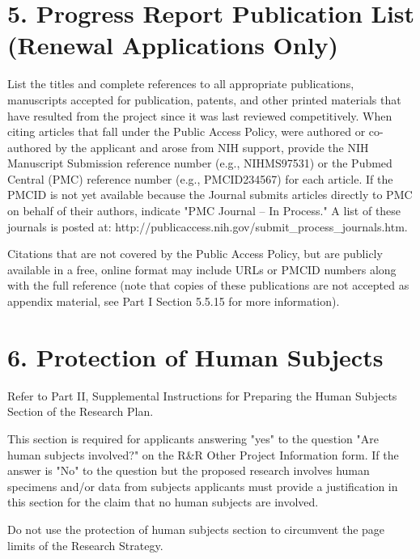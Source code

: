 \documentclass[11pt,notitlepage]{article}
\begin{document}
\section*{5. Progress Report Publication List (Renewal Applications Only)}

List the titles and complete references to all appropriate publications, manuscripts accepted for publication, patents, and other printed materials that have resulted from the project since it was last reviewed competitively. When citing articles that fall under the Public Access Policy, were authored or co-authored by the applicant and arose from NIH support, provide the NIH Manuscript Submission reference number (e.g., NIHMS97531) or the Pubmed Central (PMC) reference number (e.g., PMCID234567) for each article. If the PMCID is not yet available because the Journal submits articles directly to PMC on behalf of their authors, indicate "PMC Journal -- In Process." A list of these journals is posted at: http://publicaccess.nih.gov/submit\_process\_journals.htm.

Citations that are not covered by the Public Access Policy, but are publicly available in a free, online format may include URLs or PMCID numbers along with the full reference (note that copies of these publications are not accepted as appendix material, see Part I Section 5.5.15 for more information).


\newpage

\section*{6. Protection of Human Subjects}

Refer to Part II, Supplemental Instructions for Preparing the Human Subjects Section of the Research Plan.

This section is required for applicants answering "yes" to the question "Are human subjects involved?" on the R\&R Other Project Information form. If the answer is "No" to the question but the proposed research involves human specimens and/or data from subjects applicants must provide a justification in this section for the claim that no human subjects are involved.

Do not use the protection of human subjects section to circumvent the page limits of the Research Strategy.

\end{document}
